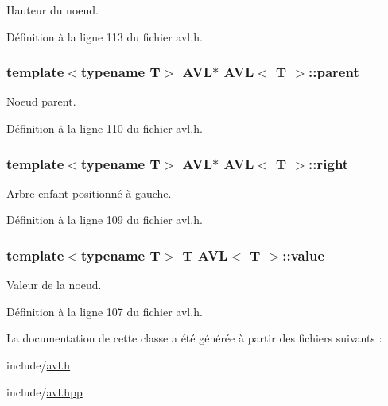 Hauteur du noeud. 



Définition à la ligne 113 du fichier avl.\+h.

\hypertarget{class_a_v_l_a3978c23794aa5e11eb37473e1cebe4e5}{
\subsubsection[{parent}]{\setlength{\rightskip}{0pt plus 5cm}template$<$typename T$>$ {\bf A\+V\+L}$\ast$ {\bf A\+V\+L}$<$ T $>$\+::parent}}\label{class_a_v_l_a3978c23794aa5e11eb37473e1cebe4e5}


Noeud parent. 



Définition à la ligne 110 du fichier avl.\+h.

\hypertarget{class_a_v_l_ac02dee89f769588763a80be6176af37b}{
\subsubsection[{right}]{\setlength{\rightskip}{0pt plus 5cm}template$<$typename T$>$ {\bf A\+V\+L}$\ast$ {\bf A\+V\+L}$<$ T $>$\+::right}}\label{class_a_v_l_ac02dee89f769588763a80be6176af37b}


Arbre enfant positionné à gauche. 



Définition à la ligne 109 du fichier avl.\+h.

\hypertarget{class_a_v_l_a3f5c40790a92e0ebd93a187812d6b698}{
\subsubsection[{value}]{\setlength{\rightskip}{0pt plus 5cm}template$<$typename T$>$ T {\bf A\+V\+L}$<$ T $>$\+::value}}\label{class_a_v_l_a3f5c40790a92e0ebd93a187812d6b698}


Valeur de la noeud. 



Définition à la ligne 107 du fichier avl.\+h.



La documentation de cette classe a été générée à partir des fichiers suivants \+:\begin{DoxyCompactItemize}
\item 
include/\hyperlink{avl_8h}{avl.\+h}\item 
include/\hyperlink{avl_8hpp}{avl.\+hpp}\end{DoxyCompactItemize}
